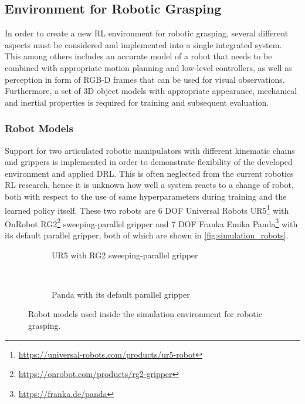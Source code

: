 \subsection{Environment for Robotic Grasping}

In order to create a new RL environment for robotic grasping, several different aspects must be considered and implemented into a single integrated system. This among others includes an accurate model of a robot that needs to be combined with appropriate motion planning and low-level controllers, as well as perception in form of RGB-D frames that can be used for visual observations. Furthermore, a set of 3D object models with appropriate appearance, mechanical and inertial properties is required for training and subsequent evaluation.


\subsubsection{Robot Models}

Support for two articulated robotic manipulators with different kinematic chains and grippers is implemented in order to demonstrate flexibility of the developed environment and applied DRL. This is often neglected from the current robotics RL research, hence it is unknown how well a system reacts to a change of robot, both with respect to the use of same hyperparameters during training and the learned policy itself. These two robots are 6 DOF Universal Robots UR5\footnote{\href{https://universal-robots.com/products/ur5-robot}{https://universal-robots.com/products/ur5-robot}} with OnRobot RG2\footnote{\href{https://onrobot.com/products/rg2-gripper}{https://onrobot.com/products/rg2-gripper}} sweeping-parallel gripper and 7 DOF Franka Emika Panda\footnote{\href{https://franka.de/panda}{https://franka.de/panda}} with its default parallel gripper, both of which are shown in \autoref{fig:simulation_robots}.

\begin{figure}[ht]
    \centering
    \begin{subfigure}[ht]{0.4975\textwidth}
        \centering
        \caption*{UR5 with RG2 sweeping-parallel gripper}
    \end{subfigure}%
    ~%
    \begin{subfigure}[ht]{0.4975\textwidth}
        \centering
        \caption*{Panda with its default parallel gripper}
    \end{subfigure}%
    \caption{Robot models used inside the simulation environment for robotic grasping.}
    \label{fig:simulation_robots}
\end{figure}

